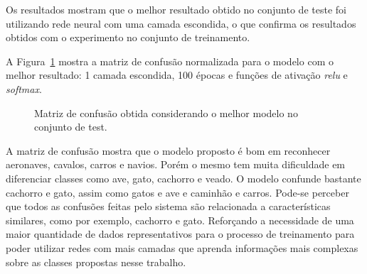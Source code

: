 \documentclass[conference]{IEEEtran}
\begin{document}
Os resultados mostram que o melhor resultado obtido no conjunto de teste foi utilizando rede neural com uma camada escondida, o que confirma os resultados obtidos com o experimento no conjunto de treinamento.

A Figura~\ref{fig:confusion} mostra a matriz de confusão normalizada para o modelo com o melhor resultado: 1 camada escondida, 100 épocas e funções de ativação \emph{relu} e \emph{softmax}.

\begin{figure}[!h]
	\centering
	{
		\setlength{\fboxsep}{1pt}
		\setlength{\fboxrule}{1pt}
	}
	\caption{\small Matriz de confusão obtida considerando o melhor modelo no conjunto de test.}
	\label{fig:confusion}
\end{figure}

A matriz de confusão mostra que o modelo proposto é bom em reconhecer aeronaves, cavalos, carros e navios. Porém o mesmo tem muita dificuldade em diferenciar classes como ave, gato, cachorro e veado. O modelo confunde bastante cachorro e gato, assim como gatos e ave e caminhão e carros. Pode-se perceber que todos as confusões feitas pelo sistema são relacionada a características similares, como por exemplo, cachorro e gato. Reforçando a necessidade de uma maior quantidade de dados representativos para o processo de treinamento para poder utilizar redes com mais camadas que aprenda informações mais complexas sobre as classes propostas nesse trabalho.

\end{document}
